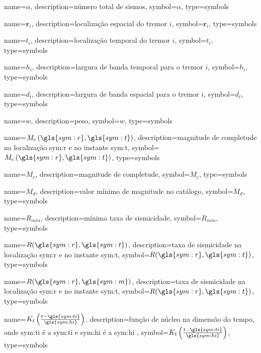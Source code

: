 {
	name={\ensuremath{\alpha}},
	description={número total de sismos},
	symbol={\ensuremath{\alpha}},
	type=symbols
}


{
	name={\ensuremath{\boldsymbol{r}_i}},
	description={localização espacial do tremor $i$},
	symbol={\ensuremath{\boldsymbol{r}_i}},
	type=symbols
}


{
	name={\ensuremath{t_i}},
	description={localização temporal do tremor $i$},
	symbol={\ensuremath{t_i}},
	type=symbols
}


{
	name={\ensuremath{h_i}},
	description={largura de banda temporal para o tremor $i$},
	symbol={\ensuremath{h_i}},
	type=symbols
}


{
	name={\ensuremath{d_i}},
	description={largura de banda espacial para o tremor $i$},
	symbol={\ensuremath{d_i}},
	type=symbols
}


{
	name={\ensuremath{ w }},
	description={peso},
	symbol={\ensuremath{ w }},
	type=symbols
}


{
	name={\ensuremath{ M_c\left( \gls{sym:r}, \gls{sym:t} \right)  }},
	description={magnitude de completude na localização \gls{sym:r} e no instante \gls{sym:t}},
	symbol={\ensuremath{ M_c\left( \gls{sym:r}, \gls{sym:t} \right) }},
	type=symbols
}


{
	name={\ensuremath{M_c}},
	description={magnitude de completude},
	symbol={\ensuremath{M_c}},
	type=symbols
}

{
	name={\ensuremath{M_d}},
	description={valor mínimo de magnitude no catálogo},
	symbol={\ensuremath{M_d}},
	type=symbols
}


{
	name={\ensuremath{R_{min}}},
	description={mínima taxa de sismicidade},
	symbol={\ensuremath{R_{min}}},
	type=symbols
}


{
	name={\ensuremath{R(\gls{sym:r},\gls{sym:t})}},
	description={taxa de sismicidade na localização \gls{sym:r} e no instante \gls{sym:t}},
	symbol={\ensuremath{R(\gls{sym:r},\gls{sym:t})}},
	type=symbols
}


{
	name={\ensuremath{R(\gls{sym:r},\gls{sym:m})}},
	description={taxa de sismicidade na localização \gls{sym:r} e no instante \gls{sym:t}},
	symbol={\ensuremath{R(\gls{sym:r},\gls{sym:t})}},
	type=symbols
}


{
	name={\ensuremath{K_t \left( \frac{ t - \gls{sym:ti} }{ \gls{sym:hi} } \right) }},
	description={função de núcleo na dimensão do tempo, onde
					\gls{sym:ti} é a \glsdesc{sym:ti} e
					\gls{sym:hi} é a \glsdesc{sym:hi}
				},
	symbol={\ensuremath{K_t \left( \frac{ t - \gls{sym:ti} }{ \gls{sym:hi} } \right)}},
	type=symbols
}

